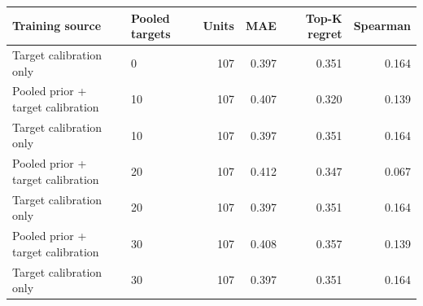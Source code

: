 \begin{tabular}{llrrrr}
\toprule
Training source & Pooled targets & Units & MAE & Top-K regret & Spearman \\
\midrule
Target calibration only & 0 & 107 & 0.397 & 0.351 & 0.164 \\
Pooled prior + target calibration & 10 & 107 & 0.407 & 0.320 & 0.139 \\
Target calibration only & 10 & 107 & 0.397 & 0.351 & 0.164 \\
Pooled prior + target calibration & 20 & 107 & 0.412 & 0.347 & 0.067 \\
Target calibration only & 20 & 107 & 0.397 & 0.351 & 0.164 \\
Pooled prior + target calibration & 30 & 107 & 0.408 & 0.357 & 0.139 \\
Target calibration only & 30 & 107 & 0.397 & 0.351 & 0.164 \\
\bottomrule
\end{tabular}
